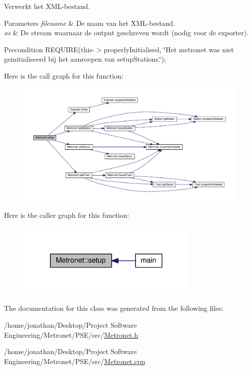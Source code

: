 Verwerkt het X\+M\+L-\/bestand. 


\begin{DoxyParams}{Parameters}
{\em filename} & De naam van het X\+M\+L-\/bestand. \\
\hline
{\em os} & De stream waarnaar de output geschreven wordt (nodig voor de exporter). \\
\hline
\end{DoxyParams}
\begin{DoxyPrecond}{Precondition}
R\+E\+Q\+U\+I\+RE(this-\/$>$properly\+Initialised, \char`\"{}\+Het metronet was niet geinitialiseerd bij het aanroepen van setup\+Stations.\char`\"{}); 
\end{DoxyPrecond}


Here is the call graph for this function\+:
\nopagebreak
\begin{figure}[H]
\begin{center}
\leavevmode
\includegraphics[width=350pt]{class_metronet_ad12d6e52c7f5c23d23e87992b4abc1fa_cgraph}
\end{center}
\end{figure}




Here is the caller graph for this function\+:
\nopagebreak
\begin{figure}[H]
\begin{center}
\leavevmode
\includegraphics[width=248pt]{class_metronet_ad12d6e52c7f5c23d23e87992b4abc1fa_icgraph}
\end{center}
\end{figure}




The documentation for this class was generated from the following files\+:\begin{DoxyCompactItemize}
\item 
/home/jonathan/\+Desktop/\+Project Software Engineering/\+Metronet/\+P\+S\+E/src/\hyperlink{_metronet_8h}{Metronet.\+h}\item 
/home/jonathan/\+Desktop/\+Project Software Engineering/\+Metronet/\+P\+S\+E/src/\hyperlink{_metronet_8cpp}{Metronet.\+cpp}\end{DoxyCompactItemize}
